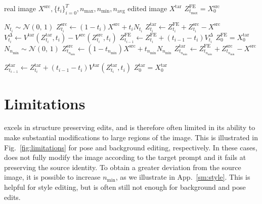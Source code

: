 \begin{algorithm}[h]
   \caption{Full \ours{} algorithm}
   \label{alg:full}
\begin{algorithmic}
   real image $X^{\text{src}},\big\{t_i\big\}^T_{i=0}, n_{\text{max}}, n_{\text{min}}, n_{\text{avg}}$ 
    edited image $X^{\text{tar}}$
    $Z^{\text{FE}}_{t_{\text{max}}}=X^{\text{src}}_0$
   
   \STATE $N_{t_i} \sim \mathcal{N}(0,\,1)$
   \STATE $Z^{\text{src}}_{t_i} \leftarrow (1-t_i)X^{\text{src}} + t_iN_{t_i}$
   \STATE $Z^{\text{tar}}_{t_i} \leftarrow Z^{\text{FE}}_{t_i} +Z^{\text{src}}_{t_i}- X^{\text{src}}$
   \STATE $V^{\Delta}_{t_i} \leftarrow V^{\text{tar}}(Z^{\text{tar}}_{t_i},t_i)-V^{\text{src}}(Z^{\text{src}}_{t_i},t_i)$
   \STATE $Z^{\text{FE}}_{t_{i-1}} \leftarrow Z^{\text{FE}}_{t_i} + (t_{i-1}-t_{i})V^{\Delta}_{t_i}$
   \ENDFOR
     $Z^{\text{FE}}_{0} = X_{0}^{\text{tar}}$
   \ELSE
      \STATE $N_{n_{\text{min}}} \sim \mathcal{N}(0,\,1)$
       \STATE $Z^{\text{src}}_{t_{n_{\text{min}}}} \leftarrow (1-t_{n_{\text{min}}})X^{\text{src}} + t_{n_{\text{min}}}N_{n_{\text{min}}}$
       \STATE $Z^{\text{tar}}_{t_{n_{\text{min}}}} \leftarrow Z^{\text{FE}}_{t_{n_{\text{min}}}} +Z^{\text{src}}_{t_{n_{\text{min}}}}- X^{\text{src}}$

            \STATE $Z^{\text{tar}}_{t_{i-1}} \leftarrow Z^{\text{tar}}_{t_i} + (t_{i-1}-t_{i})V^{\text{tar}}(Z^{\text{tar}}_{t_i}, t_i)$       
       \ENDFOR
        $Z^{\text{tar}}_{0} = X_{0}^{\text{tar}}$
   \ENDIF
\end{algorithmic}
\end{algorithm}

\clearpage
\section{Limitations}
\label{sm:limitations}

\ours{} excels in structure preserving edits, and is therefore often limited in its ability to make substantial modifications to large regions of the image. This is illustrated in Fig.~\ref{fig:limitations} for pose and background editing, respectively. In these cases, \ours{} does not fully modify the image according to the target prompt and it fails at preserving the source identity. 
To obtain a greater deviation from the source image, it is possible to increase $n_{\text{min}}$, as we illustrate in App.~\ref{sm:style}. This is helpful for style editing, but is often still not enough for background and pose edits. 

